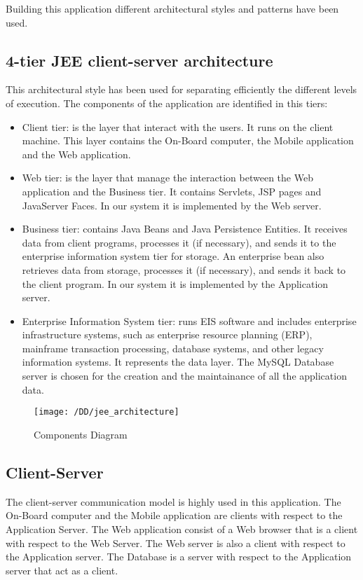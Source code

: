 Building this application different architectural styles and patterns have been used.
\subsection{4-tier JEE client-server architecture}
	This architectural style has been used for separating efficiently the different levels of execution. The components of the application are identified in this tiers:
	\begin{itemize}
		\item{Client tier: is the layer that interact with the users. It runs on the client machine. This layer contains the On-Board computer, the Mobile application and the Web application.}
		\item{Web tier: is the layer that manage the interaction between the Web application and the Business tier. It contains Servlets, JSP pages and JavaServer Faces. In our system it is implemented by the Web server.}%
		\item{Business tier: contains Java Beans and Java Persistence Entities. It receives data from client programs, processes it (if necessary), and sends it to the enterprise information system tier for storage. An enterprise bean also retrieves data from storage, processes it (if necessary), and sends it back to the client program. In our system it is implemented by the Application server.}
		\item{Enterprise Information System tier: runs EIS software and includes enterprise infrastructure systems, such as enterprise resource planning (ERP), mainframe transaction processing, database systems, and other legacy information systems. It represents the data layer. The MySQL Database server is chosen for the creation and the maintainance of all the application data.}
	\end{itemize}
	\begin{figure}[!ht]
  \centering
  \vspace{0.2cm}
  \texttt{[image: /DD/jee\_architecture]}\\
  \vspace{0.4cm}
  \caption{Components Diagram} 
  \label{fig:Architecture of the system} 
\end{figure}
\subsection{Client-Server}
	The client-server communication model is highly used in this application.
	The On-Board computer and the Mobile application are clients with respect to the Application Server. The Web application consist of a Web browser that is a client with respect to the Web Server. The Web server is also a client with respect to the Application server. The Database is a server with respect to the Application server that act as a client.
